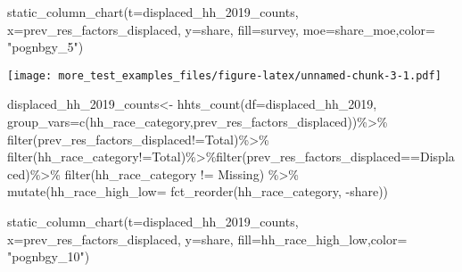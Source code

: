\documentclass[
]{article}
\newenvironment{Shaded}{\begin{snugshade}}{\end{snugshade}}
\newcommand{\AttributeTok}[1]{\textcolor[rgb]{0.77,0.63,0.00}{#1}}
\newcommand{\FunctionTok}[1]{\textcolor[rgb]{0.00,0.00,0.00}{#1}}
\newcommand{\NormalTok}[1]{#1}
\newcommand{\OtherTok}[1]{\textcolor[rgb]{0.56,0.35,0.01}{#1}}
\newcommand{\SpecialCharTok}[1]{\textcolor[rgb]{0.00,0.00,0.00}{#1}}
\newcommand{\StringTok}[1]{\textcolor[rgb]{0.31,0.60,0.02}{#1}}
\begin{document}
\begin{Shaded}
\begin{Highlighting}[]
\FunctionTok{static\_column\_chart}\NormalTok{(}\AttributeTok{t=}\NormalTok{displaced\_hh\_2019\_counts, }\AttributeTok{x=}\StringTok{\textquotesingle{}prev\_res\_factors\_displaced\textquotesingle{}}\NormalTok{, }\AttributeTok{y=}\StringTok{\textquotesingle{}share\textquotesingle{}}\NormalTok{, }\AttributeTok{fill=}\StringTok{\textquotesingle{}survey\textquotesingle{}}\NormalTok{, }\AttributeTok{moe=}\StringTok{\textquotesingle{}share\_moe\textquotesingle{}}\NormalTok{,}\AttributeTok{color=}  \StringTok{"pognbgy\_5"}\NormalTok{)}
\end{Highlighting}
\end{Shaded}

\texttt{[image: more\_test\_examples\_files/figure-latex/unnamed-chunk-3-1.pdf]}

\begin{Shaded}
\begin{Highlighting}[]
\NormalTok{displaced\_hh\_2019\_counts}\OtherTok{\textless{}{-}} \FunctionTok{hhts\_count}\NormalTok{(}\AttributeTok{df=}\NormalTok{displaced\_hh\_2019, }\AttributeTok{group\_vars=}\FunctionTok{c}\NormalTok{(}\StringTok{\textquotesingle{}hh\_race\_category\textquotesingle{}}\NormalTok{,}\StringTok{\textquotesingle{}prev\_res\_factors\_displaced\textquotesingle{}}\NormalTok{))}\SpecialCharTok{\%\textgreater{}\%}
\FunctionTok{filter}\NormalTok{(prev\_res\_factors\_displaced}\SpecialCharTok{!=}\StringTok{\textquotesingle{}Total\textquotesingle{}}\NormalTok{)}\SpecialCharTok{\%\textgreater{}\%}
  \FunctionTok{filter}\NormalTok{(hh\_race\_category}\SpecialCharTok{!=}\StringTok{\textquotesingle{}Total\textquotesingle{}}\NormalTok{)}\SpecialCharTok{\%\textgreater{}\%}\FunctionTok{filter}\NormalTok{(prev\_res\_factors\_displaced}\SpecialCharTok{==}\StringTok{\textquotesingle{}Displaced\textquotesingle{}}\NormalTok{)}\SpecialCharTok{\%\textgreater{}\%}
  \FunctionTok{filter}\NormalTok{(hh\_race\_category }\SpecialCharTok{!=} \StringTok{\textquotesingle{}Missing\textquotesingle{}}\NormalTok{) }\SpecialCharTok{\%\textgreater{}\%}
  \FunctionTok{mutate}\NormalTok{(}\AttributeTok{hh\_race\_high\_low=} \FunctionTok{fct\_reorder}\NormalTok{(hh\_race\_category, }\SpecialCharTok{{-}}\NormalTok{share))}

\FunctionTok{static\_column\_chart}\NormalTok{(}\AttributeTok{t=}\NormalTok{displaced\_hh\_2019\_counts, }\AttributeTok{x=}\StringTok{\textquotesingle{}prev\_res\_factors\_displaced\textquotesingle{}}\NormalTok{, }\AttributeTok{y=}\StringTok{\textquotesingle{}share\textquotesingle{}}\NormalTok{, }\AttributeTok{fill=}\StringTok{\textquotesingle{}hh\_race\_high\_low\textquotesingle{}}\NormalTok{,}\AttributeTok{color=}  \StringTok{"pognbgy\_10"}\NormalTok{)}
\end{Highlighting}
\end{Shaded}
\end{document}
